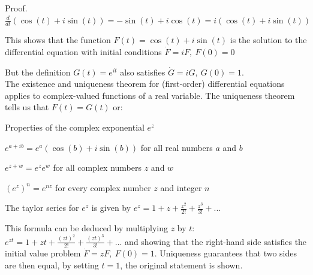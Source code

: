 \documentclass[11pt, openright]{book}
\begin{document}
\begin{dent}{Proof.}
    $\frac{d}{dt}(\cos(t)+i\sin(t))=-\sin(t)+i\cos(t)=i(\cos(t)+i\sin(t))$

    This shows that the function $F(t)=\cos(t)+i\sin(t)$ is the solution to the differential equation with initial conditions $\dot{F}=iF,\  F(0)=0$

    But the definition $G(t)=e^{it}$ also satisfies $\dot{G}=iG,\ G(0)=1$.\\
    The existence and uniqueness theorem for (first-order) differential equations applies to complex-valued functions of a real variable. The uniqueness theorem tells us that $F(t)=G(t)$ or:

\end{dent}

\begin{dent}{Properties of the complex exponential $e^z$}
    \begin{items}{-10pt}{-10pt}
        \item $e^{a+ib}=e^a(\cos(b)+i\sin(b))$ for all real numbers $a$ and $b$
        \item $e^{z+w}=e^ze^w$ for all complex numbers $z$ and $w$
        \item $(e^z)^n=e^{nz}$ for every complex number $z$ and integer $n$
        \item The taylor series for $e^z$ is given by $e^z=1+z+\frac{z^2}{2!}+\frac{z^3}{3!}+...$

        This formula can be deduced by multiplying $z$ by $t$: $e^{zt}=1+zt+\frac{(zt)^2}{2!}+\frac{(zt)^3}{3!}+...$ and showing that the right-hand side satisfies the initial value problem $\dot{F}=zF,\ F(0)=1$. Uniqueness guarantees that two sides are then equal, by setting $t=1$, the original statement is shown.

    \end{items}
\end{dent}

\newpage
\end{document}
